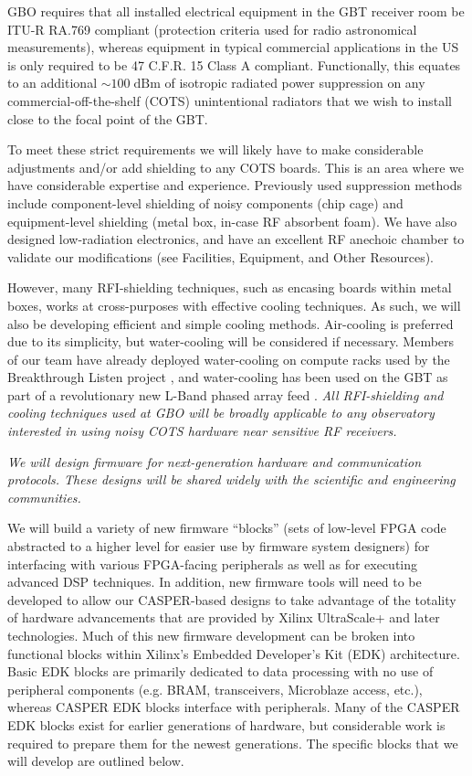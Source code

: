 \documentclass[10pt]{myNSF}
\begin{document}
GBO requires that all installed electrical equipment in the GBT
receiver room be ITU-R RA.769 compliant (protection criteria used for
radio astronomical measurements), whereas equipment in typical
commercial applications in the US is only required to be 47 C.F.R. 15
Class A compliant. Functionally, this equates to an additional $\sim
100\; \mathrm{dBm}$ of isotropic radiated power suppression on any
commercial-off-the-shelf (COTS) unintentional radiators that we wish
to install close to the focal point of the GBT.

To meet these strict requirements we will likely have to make
considerable adjustments and/or add shielding to any COTS boards.
This is an area where we have considerable expertise and experience.
Previously used suppression methods include component-level shielding
of noisy components (chip cage) and equipment-level shielding (metal
box, in-case RF absorbent foam). We have also designed low-radiation
electronics, and have an excellent RF anechoic chamber to validate our
modifications (see Facilities, Equipment, and Other Resources).

However, many RFI-shielding techniques, such as encasing boards within
metal boxes, works at cross-purposes with effective cooling
techniques. As such, we will also be developing efficient and simple
cooling methods.  Air-cooling is preferred due to its simplicity, but
water-cooling will be considered if necessary.  Members of our team
have already deployed water-cooling on compute racks used by the
Breakthrough Listen project \cite{mpl+17}, and water-cooling has been
used on the GBT as part of a revolutionary new L-Band phased array
feed \cite{rpb+18}.  \emph{All RFI-shielding and cooling techniques
  used at GBO will be broadly applicable to any observatory interested
  in using noisy COTS hardware near sensitive RF receivers.}

\label{sec:firmware}

\emph{We will design firmware for next-generation hardware and
  communication protocols.  These designs will be shared widely with
  the scientific and engineering communities.}

We will build a variety of new firmware ``blocks'' (sets of low-level
FPGA code abstracted to a higher level for easier use by firmware
system designers) for interfacing with various FPGA-facing peripherals
as well as for executing advanced DSP techniques.  In addition, new
firmware tools will need to be developed to allow our CASPER-based
designs to take advantage of the totality of hardware advancements
that are provided by Xilinx UltraScale+ and later technologies.  Much
of this new firmware development can be broken into functional blocks
within Xilinx's Embedded Developer's Kit (EDK) architecture.  Basic
EDK blocks are primarily dedicated to data processing with no use of
peripheral components (e.g. BRAM, transceivers, Microblaze access,
etc.), whereas CASPER EDK blocks interface with peripherals.  Many of
the CASPER EDK blocks exist for earlier generations of hardware, but
considerable work is required to prepare them for the newest
generations.  The specific blocks that we will develop are outlined
below.
\end{document}
